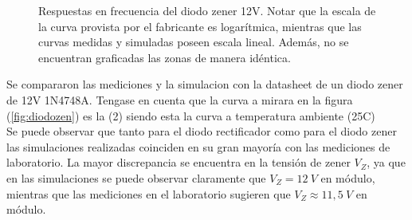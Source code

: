 \documentclass[a4paper]{article}
\begin{document}
\begin{figure}[H]%
    \centering
    \qquad
    \caption{Respuestas en frecuencia del diodo zener 12V. Notar que la escala de la curva provista por el fabricante es logarítmica, mientras que las curvas medidas y simuladas poseen escala lineal. Además, no se encuentran graficadas las zonas de manera idéntica.}%
\end{figure}
Se compararon las mediciones y la simulacion con la datasheet de un diodo zener de 12V 1N4748A.
Tengase en cuenta que la curva a mirara en la figura (\ref{fig:diodozen}) es la (2) siendo esta la curva  a temperatura ambiente (25\degree C) \\

Se puede observar que tanto para el diodo rectificador como para el diodo zener las simulaciones realizadas coinciden en su gran mayoría con las mediciones de laboratorio. La mayor discrepancia se encuentra en la tensión de zener $V_Z$, ya que en las simulaciones se puede observar claramente que $V_Z=12 \ V$ en módulo, mientras que las mediciones en el laboratorio sugieren que $V_Z \approx 11,5 \ V$ en módulo.
\end{document}
